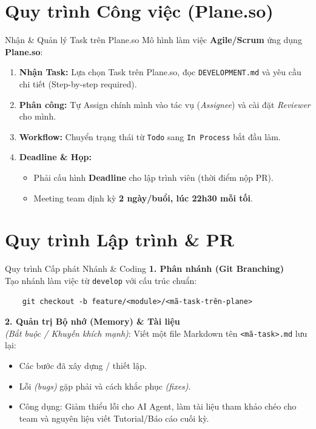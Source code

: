 \documentclass[10pt, aspectratio=169]{beamer}
\begin{document}
\section{Quy trình Công việc (Plane.so)}

\begin{frame}{Nhận \& Quản lý Task trên Plane.so}
    Mô hình làm việc \textbf{Agile/Scrum} ứng dụng \textbf{Plane.so}:
    \begin{enumerate}
        \item \textbf{Nhận Task:} Lựa chọn Task trên Plane.so, đọc \texttt{DEVELOPMENT.md} và yêu cầu chi tiết (Step-by-step required).
        \item \textbf{Phân công:} Tự Assign chính mình vào tác vụ (\textit{Assignee}) và cài đặt \textit{Reviewer} cho mình.
        \item \textbf{Workflow:} Chuyển trạng thái từ \texttt{Todo} sang \texttt{In Process} bắt đầu làm.
        \item \textbf{Deadline \& Họp:} 
        \begin{itemize}
            \item Phải cấu hình \textbf{Deadline} cho lập trình viên (thời điểm nộp PR).
            \item Meeting team định kỳ \textbf{2 ngày/buổi, lúc 22h30 mỗi tối}.
        \end{itemize}
    \end{enumerate}
\end{frame}

\section{Quy trình Lập trình \& PR}

\begin{frame}[fragile]{Quy trình Cấp phát Nhánh \& Coding}
    \textbf{1. Phân nhánh (Git Branching)} \\
    Tạo nhánh làm việc từ \texttt{develop} với cấu trúc chuẩn:
    \begin{verbatim}
    git checkout -b feature/<module>/<mã-task-trên-plane>
    \end{verbatim}
    
    \vspace{0.2cm}
    \textbf{2. Quản trị Bộ nhớ (Memory) \& Tài liệu} \\
    \textit{(Bắt buộc / Khuyến khích mạnh)}: Viết một file Markdown tên \texttt{<mã-task>.md} lưu lại:
    \begin{itemize}
        \item Các bước đã xây dựng / thiết lập.
        \item Lỗi \textit{(bugs)} gặp phải và cách khắc phục \textit{(fixes)}.
        \item Công dụng: Giảm thiểu lỗi cho AI Agent, làm tài liệu tham khảo chéo cho team và nguyên liệu viết Tutorial/Báo cáo cuối kỳ.
    \end{itemize}
\end{frame}
\end{document}
